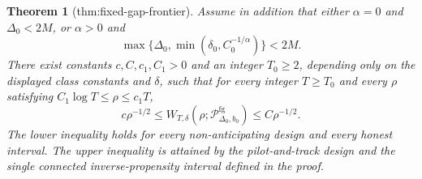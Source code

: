 \documentclass{article}
\newtheorem{theorem}{Theorem}
\begin{document}
\begin{theorem}[thm:fixed-gap-frontier]\label{thm:fixed-gap-frontier}
Assume in addition that either \(\alpha=0\) and \(\Delta_0<2M\), or \(\alpha>0\) and
\[
\max\{\Delta_0,\min(\delta_0,C_0^{-1/\alpha})\}<2M.
\]
There exist constants \(c,C,c_1,C_1>0\) and an integer \(T_0\geq2\), depending only on the displayed class constants and \(\delta\), such that for every integer \(T\geq T_0\) and every \(\rho\) satisfying \(C_1\log T\leq\rho\leq c_1T\),
\[
 c\rho^{-1/2}\leq W_{T,\delta}(\rho;\mathcal P_{\Delta_0,b_0}^{\mathrm{fg}})\leq C\rho^{-1/2}.
\]
The lower inequality holds for every non-anticipating design and every honest interval. The upper inequality is attained by the pilot-and-track design and the single connected inverse-propensity interval defined in the proof.
\end{theorem}
\end{document}

